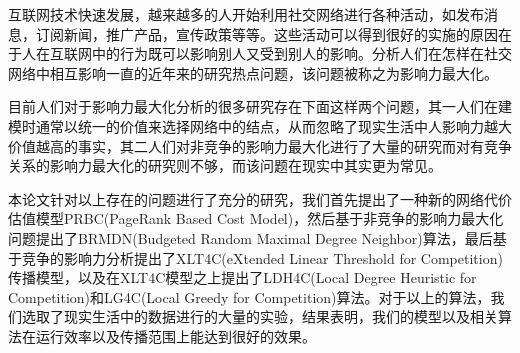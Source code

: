 
 

\makeatletter
\ifthu@bachelor\relax\else
  \ifthu@doctor
  \else
    \ifthu@master
    \fi
  \fi
\fi
\makeatother






\begin{cabstract}
互联网技术快速发展，越来越多的人开始利用社交网络进行各种活动，如发布消息，订阅新闻，推广产品，宣传政策等等。这些活动可以得到很好的实施的原因在于人在互联网中的行为既可以影响别人又受到别人的影响。分析人们在怎样在社交网络中相互影响一直的近年来的研究热点问题，该问题被称之为影响力最大化。

目前人们对于影响力最大化分析的很多研究存在下面这样两个问题，其一人们在建模时通常以统一的价值来选择网络中的结点，从而忽略了现实生活中人影响力越大价值越高的事实，其二人们对非竞争的影响力最大化进行了大量的研究而对有竞争关系的影响力最大化的研究则不够，而该问题在现实中其实更为常见。

本论文针对以上存在的问题进行了充分的研究，我们首先提出了一种新的网络代价估值模型PRBC(PageRank Based Cost Model)，然后基于非竞争的影响力最大化问题提出了BRMDN(Budgeted Random Maximal Degree Neighbor)算法，最后基于竞争的影响力分析提出了XLT4C(eXtended Linear Threshold for Competition)传播模型，以及在XLT4C模型之上提出了LDH4C(Local Degree Heuristic for Competition)和LG4C(Local Greedy for Competition)算法。对于以上的算法，我们选取了现实生活中的数据进行的大量的实验，结果表明，我们的模型以及相关算法在运行效率以及传播范围上能达到很好的效果。

\end{cabstract}


